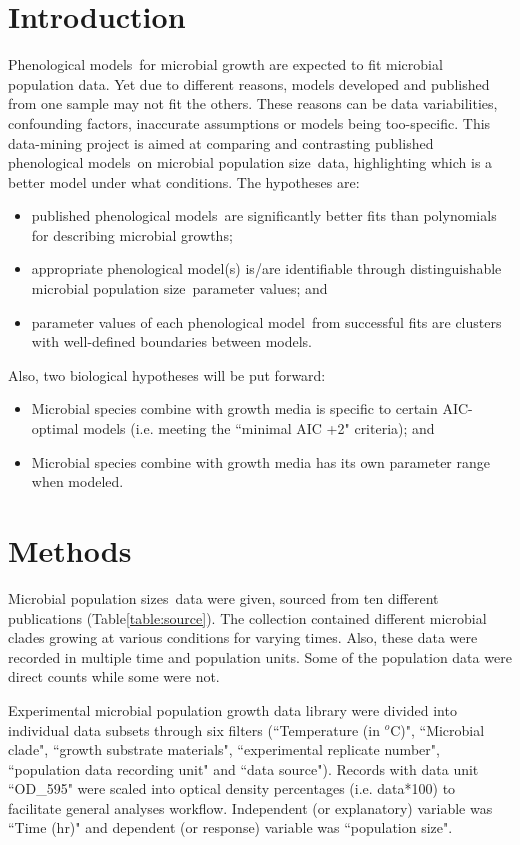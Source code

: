 \documentclass[a4paper, 11pt]{article}
\newcommand{\pml}{phenological model}
\newcommand{\pms}{phenological models}
\newcommand{\Pms}{Phenological models}
\newcommand{\pop}{population size}
\newcommand{\pps}{population sizes}
\begin{document}
	\section*{Introduction}
	\Pms\ for microbial growth are expected to fit microbial population data.  Yet due to different reasons, models developed and published from one sample may not fit the others.  These reasons can be data variabilities, confounding factors, inaccurate assumptions or models being too-specific.  This data-mining project is aimed at comparing and contrasting published \pms\ on microbial \pop\ data, highlighting which is a better model under what conditions.  The hypotheses are:
	\begin{itemize}
		\item published \pms\ are significantly better fits than polynomials for describing microbial growths;
		\item appropriate \pml(s) is/are identifiable through distinguishable microbial \pop\ parameter values; and
		\item parameter values of each \pml\ from successful fits are clusters with well-defined boundaries between models.
	\end{itemize}
	Also, two biological hypotheses will be put forward:
	\begin{itemize}
		\item Microbial species combine with growth media is specific to certain AIC-optimal models (i.e. meeting the ``minimal AIC +2"\autocite{burnham2004multimodel} criteria); and
		\item Microbial species combine with growth media has its own parameter range when modeled.
	\end{itemize}
	
	\section*{Methods}
	
	Microbial \pps\ data were given, sourced from ten different publications (Table\ref{table:source}).  The collection contained different microbial clades growing at various conditions for varying times.  Also, these data were recorded in multiple time and population units.  Some of the population data were direct counts while some were not.
	
	Experimental microbial population growth data library were divided into individual data subsets through six filters (``Temperature (in $^o$C)", ``Microbial clade", ``growth substrate materials", ``experimental replicate number", ``population data recording unit" and ``data source").  Records with data unit ``OD\_595" were scaled into optical density percentages (i.e. data*100) to facilitate general analyses workflow.  Independent (or explanatory) variable was ``Time (hr)" and dependent (or response) variable was ``\pop".
	
\end{document}
